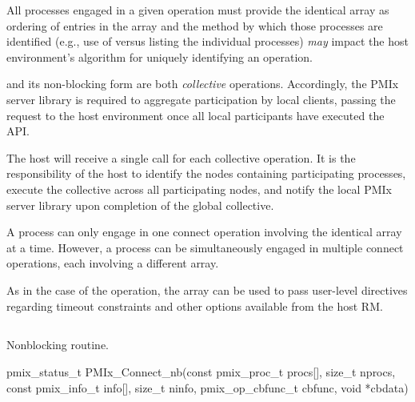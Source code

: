 \adviceuserstart
All processes engaged in a given  operation must provide the identical  array as ordering of entries in the array and the method by which those processes are identified (e.g., use of  versus listing the individual processes) \textit{may} impact the host environment's algorithm for uniquely identifying an operation.
\adviceuserend

\adviceimplstart
{} and its non-blocking form are both \emph{collective} operations. Accordingly, the \ac{PMIx} server library is required to aggregate participation by local clients, passing the request to the host environment once all local participants have executed the \ac{API}.
\adviceimplend

\advicermstart
The host will receive a single call for each collective operation. It is the responsibility of the host to identify the nodes containing participating processes, execute the collective across all participating nodes, and notify the local \ac{PMIx} server library upon completion of the global collective.
\advicermend

A process can only engage in one connect operation involving the identical  array at a time.
However, a process can be simultaneously engaged in multiple connect operations, each involving a different  array.

As in the case of the  operation, the  array can be used to pass user-level directives regarding timeout constraints and other options available from the host \ac{RM}.


\subsection{}

\summary

Nonblocking  routine.

\format

\cspecificstart
\begin{codepar}
pmix_status_t
PMIx_Connect_nb(const pmix_proc_t procs[], size_t nprocs,
                const pmix_info_t info[], size_t ninfo,
                pmix_op_cbfunc_t cbfunc, void *cbdata)
\end{codepar}
\cspecificend

\begin{arglist}
\end{arglist}

